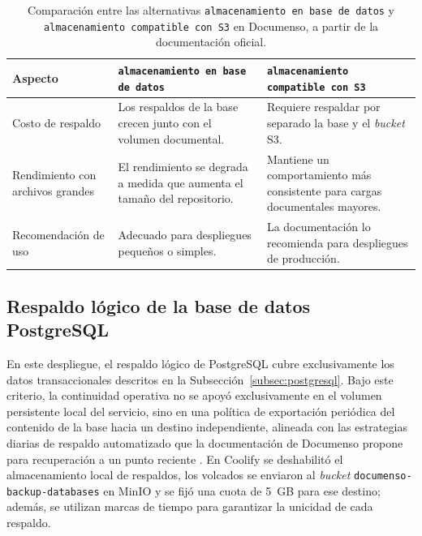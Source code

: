 \begin{table}[!htbp]
    \centering
    \caption[Comparación entre almacenamiento en base de datos y almacenamiento compatible con S3 en Documenso]{Comparación entre las alternativas \texttt{almacenamiento en base de datos} y \texttt{almacenamiento compatible con S3} en Documenso, a partir de la documentación oficial.}
    \label{tab:documenso_storage_compare}
    \begin{tabular}{p{} p{} p{}}
        \toprule
        Aspecto & \texttt{almacenamiento en base de datos} & \texttt{almacenamiento compatible con S3} \\
        \midrule
        Costo de respaldo & Los respaldos de la base crecen junto con el volumen documental. & Requiere respaldar por separado la base y el \textit{bucket} S3. \\
        Rendimiento con archivos grandes & El rendimiento se degrada a medida que aumenta el tamaño del repositorio. & Mantiene un comportamiento más consistente para cargas documentales mayores. \\
        Recomendación de uso & Adecuado para despliegues pequeños o simples. & La documentación lo recomienda para despliegues de producción. \\
        \bottomrule
    \end{tabular}
\end{table}

\subsection{Respaldo lógico de la base de datos PostgreSQL}

En este despliegue, el respaldo lógico de PostgreSQL cubre exclusivamente los datos transaccionales descritos en la Subsección~\ref{subsec:postgresql}. Bajo este criterio, la continuidad operativa no se apoyó exclusivamente en el volumen persistente local del servicio, sino en una política de exportación periódica del contenido de la base hacia un destino independiente, alineada con las estrategias diarias de respaldo automatizado que la documentación de Documenso propone para recuperación a un punto reciente \cite{documenso_backups}. En Coolify se deshabilitó el almacenamiento local de respaldos, los volcados se enviaron al \textit{bucket} \texttt{documenso-backup-databases} en MinIO y se fijó una cuota de 5~GB para ese destino; además, se utilizan marcas de tiempo para garantizar la unicidad de cada respaldo.

